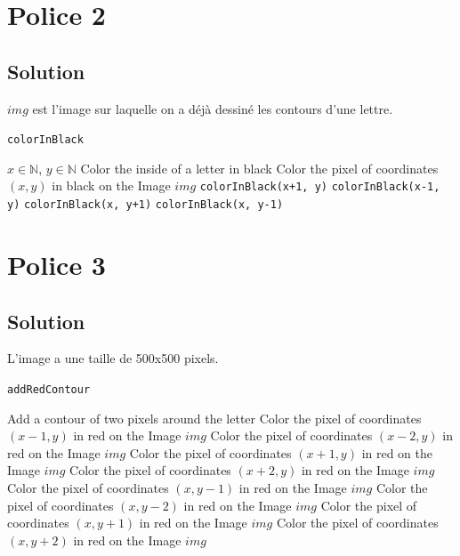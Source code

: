 \documentclass[a4paper, 12pt]{article}
\begin{document}
\newpage
\section{Police 2}	
\subsection{Solution}

$img$ est l'image sur laquelle on a déjà dessiné les contours d'une lettre.
 
\begin{algorithm}
	\caption{\texttt{colorInBlack}}
		\begin{algorithmic}[1]
		\Require $x \in \mathbb{N}$, $y \in \mathbb{N}$
		\Ensure Color the inside of a letter in black
			\State \Return
		\EndIf
			\State Color the pixel of coordinates $(x, y)$ in black on the Image $img$
			\State \texttt{colorInBlack(x+1, y)} 
			\State \texttt{colorInBlack(x-1, y)} 
			\State \texttt{colorInBlack(x, y+1)} 
			\State \texttt{colorInBlack(x, y-1)} 
		\EndIf	
		\EndFunction
		\end{algorithmic}
\end{algorithm}

\section{Police 3}			
\subsection{Solution}

L'image a une taille de 500x500 pixels.
\begin{algorithm}
	\caption{\texttt{addRedContour}}
		\begin{algorithmic}[1]
		\Require 
		\Ensure Add a contour of two pixels around the letter
					\State Color the pixel of coordinates $(x-1, y)$ in red on the Image $img$
					\State Color the pixel of coordinates $(x-2, y)$ in red on the Image $img$
				\EndIf
					\State Color the pixel of coordinates $(x+1, y)$ in red on the Image $img$
					\State Color the pixel of coordinates $(x+2, y)$ in red on the Image $img$
				\EndIf
					\State Color the pixel of coordinates $(x, y-1)$ in red on the Image $img$
					\State Color the pixel of coordinates $(x, y-2)$ in red on the Image $img$
				\EndIf
					\State Color the pixel of coordinates $(x, y+1)$ in red on the Image $img$
					\State Color the pixel of coordinates $(x, y+2)$ in red on the Image $img$ 
				\EndIf	
			\EndFor
		\EndFor
		\EndFunction
		\end{algorithmic}
\end{algorithm}
 
\end{document}
